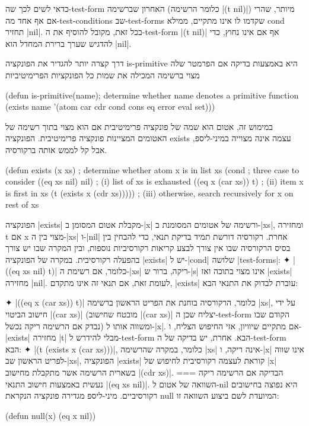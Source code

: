 כדאי לשים לכך שה-test-form האחרון שברשימה (כלומר הרשימה \T|(t nil)|) מיותר,
שהרי אם אף אחד מה-test-conditions שב-test-forms שקדמו לו אינו מתקיים, ממילא
cond תחזיר \E|nil|. בכל זאת, מקובל להוסיף את ה-test-form \T|(t nil)| אף אם אינו
נחוץ, כדי להדגיש שערך ברירת המחדל הוא \E|nil|.

דרך קצרה יותר להגדיר את הפונקציה is-primitive היא באמצעות בדיקה אם הפרמטר
שלה מצוי ברשימה המכילה את שמות כל הפונקציות הפרימיטיביות
\begin{KERNEL}
(defun is-primitive(name); determine whether name denotes a primitive function
  (exists name '(atom car cdr cond cons eq error eval set)))
\end{KERNEL}
במימוש זה, אטום הוא שמה של פונקציה פרימיטיבית אם הוא מצוי בתוך רשימה של האטומים
המציינות פונקציה פרימיטיבית. הפונקציה exists עצמה אינה מצוייה במיני-ליספ, אבל
קל לממש אותה ברקורסיה.
\begin{LISP}
(defun exists (x xs) ; determine whether atom x is in list xs
  (cond ; three case to consider
    ((eq xs nil) nil) ; (i) list of xs is exhausted
    ((eq x (car xs)) t) ; (ii) item x is first in xs
    (t (exists x (cdr xs))))) ; (iii) otherwise, search recursively for x on rest of xs
\end{LISP}
הפונקציה \T|exists| מקבלת אטום המסומן ב-\T|x| ורשימה של אטומים המסומנת
ב-\T|xs|, ומחזירה t אם x מצוי בין ה-\T|xs| ו-\T|nil| אחרת. רקורסיה דורשת תמיד
בדיקת תנאי, כדי להבחין בין בסיס הרקורסיה שבו אין צורך לבצע קריאות רקורסיביות
נוספות, ובין המקרה שבו יש צורך בהפעלה רקורסיבית. במקרה של הפונקציה \T|exists|
יש ל-\T|cond| שלושה \E|test-forms|:
✦ \T|((eq xs nil) t)| כלומר, אם רשימת ה-\T|xs| ריקה, ברור ש-\T|s| אינו מצוי
בתוכה ואז \T|exists| מחזירה \T|nil|. לעומת זאת, אם תנאי זה אינו מתקדם,
\T|exists| עוברת לבדוק את התנאי הבא:

✦ \T|((eq x (car xs)) t)| כלומר, הרקורסיה בוחנת את הפריט הראשון ברשימה \T|xs|,
על ידי חישוב הביטוי \T|(car xs)| (מובטח שחישוב \T|(car xs)| יצליח שכן
ה-test-form הקודם שבו נבדק אם הרשימה ריקה נכשל) ומשווה אותו ל-\T|x|. אם מתקיים
שיוויון, אזי החיפוש הצליח, ו-\T|exists| מחזירה \T|t| מבלי להידרש ל-test-form
הבא. אחרת, יש בדיקה של ה-test-form הבא:
✦ \T|(t (exists x (car xs)))|, כלומר, במקרה שהרשימה \T|xs| אינה ריקה, ו-\T|x|
אינו שווה לפריט הראשון שב-\T|xs|, הפונקציה \T|exists| קוראת לעצמה רקורסיבית לחיפוש של
\T|x| בשארית הרשימה אשר מתקבלת מחישוב \T|(cdr xs)|.
===
הבדיקה אם הרשימה ריקה נעשית באמצעות חישוב התנאי \T|(eq xs nil)|. השוואה של
אטום ל-nil היא נפוצה בחישובים רקורסיביים. מיני-ליספ מגדירה פונקציה הנקראת null
המיועדת לשם ביצוע השוואה זו:
\begin{LIBRARY}
(defun null(x) (eq x nil))
\end{LIBRARY}

